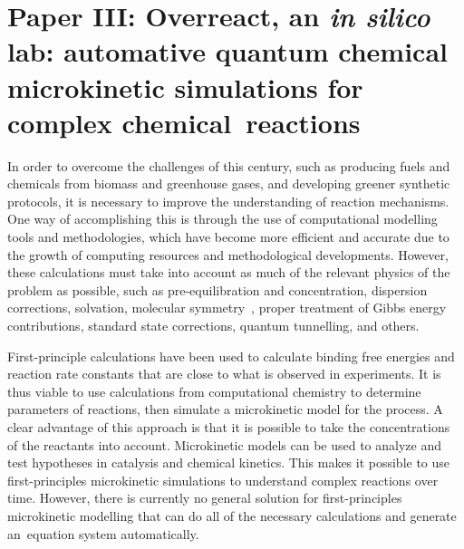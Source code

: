 \chapter{Paper III:\@
  Overreact,
  an \emph{in silico} lab:
  \linebreak
  automative quantum chemical microkinetic simulations
  for complex chemical~reactions
 }%
\label{ch:paper3}

\begin{citacao}
\end{citacao}

In order to overcome the challenges of this century,
such as producing fuels and chemicals from biomass and greenhouse gases,
and developing greener synthetic protocols,
it is necessary to improve the understanding of reaction mechanisms.
One way of accomplishing this is through the use of computational modelling tools and methodologies,
which have become more efficient and accurate due to the growth of computing resources and methodological developments.
However,
these calculations must take into account as much of the relevant physics of the problem as possible,
such as pre-equilibration and concentration,
dispersion corrections,
solvation,
molecular symmetry~\cite{Beruski_2013},
proper treatment of Gibbs energy contributions,
standard state corrections,
quantum tunnelling,
and others.

First-principle calculations have been used to calculate binding free energies
and reaction rate constants that are close to what is observed in experiments.
It is thus viable to use calculations from computational chemistry to determine parameters of reactions,
then simulate a microkinetic model for the process.
A clear advantage of this approach is that it is possible to take the concentrations of the reactants into account.
Microkinetic models can be used to analyze and test hypotheses in catalysis and chemical kinetics.
This makes it possible to use first-principles microkinetic simulations to understand complex reactions over time.
However,
there is currently no general solution for first-principles microkinetic modelling
that can do all of the necessary calculations and generate an~equation system automatically.

